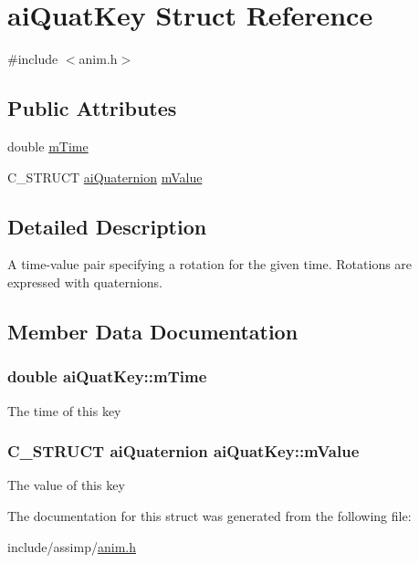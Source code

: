 \hypertarget{structaiQuatKey}{\section{ai\-Quat\-Key \-Struct \-Reference}
\label{structaiQuatKey}
}


{\ttfamily \#include $<$anim.\-h$>$}

\subsection*{\-Public \-Attributes}
\begin{DoxyCompactItemize}
\item 
double \hyperlink{structaiQuatKey_afb56b697e491c918bdeb1b32d03bbcf8}{m\-Time}
\item 
\-C\-\_\-\-S\-T\-R\-U\-C\-T \hyperlink{structaiQuaternion}{ai\-Quaternion} \hyperlink{structaiQuatKey_a08bf706065137951fd89c5914bb5a2aa}{m\-Value}
\end{DoxyCompactItemize}


\subsection{\-Detailed \-Description}
\-A time-\/value pair specifying a rotation for the given time. \-Rotations are expressed with quaternions. 

\subsection{\-Member \-Data \-Documentation}
\hypertarget{structaiQuatKey_afb56b697e491c918bdeb1b32d03bbcf8}{
\subsubsection[{m\-Time}]{\setlength{\rightskip}{0pt plus 5cm}double {\bf ai\-Quat\-Key\-::m\-Time}}}\label{structaiQuatKey_afb56b697e491c918bdeb1b32d03bbcf8}
\-The time of this key \hypertarget{structaiQuatKey_a08bf706065137951fd89c5914bb5a2aa}{
\subsubsection[{m\-Value}]{\setlength{\rightskip}{0pt plus 5cm}\-C\-\_\-\-S\-T\-R\-U\-C\-T {\bf ai\-Quaternion} {\bf ai\-Quat\-Key\-::m\-Value}}}\label{structaiQuatKey_a08bf706065137951fd89c5914bb5a2aa}
\-The value of this key 

\-The documentation for this struct was generated from the following file\-:\begin{DoxyCompactItemize}
\item 
include/assimp/\hyperlink{anim_8h}{anim.\-h}\end{DoxyCompactItemize}
